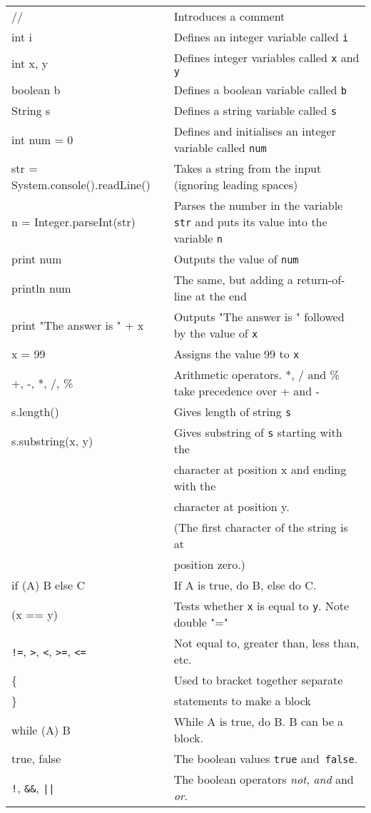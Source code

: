 
\begin{tabular}{p{6cm}p{7cm}}
// & Introduces a comment\\
int i & Defines an integer variable called \texttt{i}\\
int x, y & Defines integer variables called \texttt{x} and \texttt{y}\\
boolean b & Defines a boolean variable called \texttt{b}\\
String s & Defines a string variable called \texttt{s}\\
int num = 0 & Defines and initialises an integer variable called \texttt{num}\\
str = System.console().readLine() & Takes a string from the input
(ignoring leading spaces) \\
n = Integer.parseInt(str) & Parses the number in the variable
\texttt{str} and puts its value into the variable \texttt{n} \\
print num & Outputs the value of \texttt{num}\\
println num & The same, but adding a return-of-line at the end\\
print "The answer is " + x & Outputs "The answer is " followed by the value of \texttt{x}\\
x = 99 & Assigns the value 99 to \texttt{x}\\
+, -, *, /, \% & Arithmetic operators.  *, / and \% take precedence over + and -\\
s.length() & Gives length of string \texttt{s}\\
s.substring(x, y) & Gives substring of \texttt{s} starting with the \\
                  & character at position x and ending with the \\
                  & character at position y.\\
                  & (The first character of the string is at \\ 
                  & position zero.)\\
if (A) B else C   & If A is true, do B, else do C.\\
(x == y)          & Tests whether \texttt{x} is equal to \texttt{y}.  Note double "="\\
\verb+!=+, \verb+>+, \verb+<+, \verb+>=+, \verb+<=+ 
                  & Not equal to, greater than, less than, etc.\\
\{ & Used to bracket together separate \\ 
\} & statements to make a block\\
while (A) B & While A is true, do B.  B can be a block.\\
true, false & The boolean values \texttt{true} and\texttt{ false}.\\
\verb+!+, \verb+&&+, \verb+||+  & The boolean operators \emph{not}, \emph{and} and \emph{or}.\\
\end{tabular}
\vspace*{5pt}



